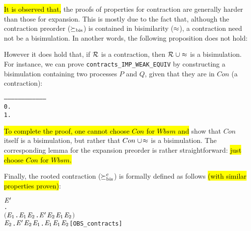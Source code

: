 \hl{It is observed that,} the proofs of properties for contraction are
generally harder than those for expansion. This is mostly due to the fact
  that, although the contraction preorder ($\mathrel{\succeq_{\rm{bis}}}$) is contained in
  bisimilarity ($\approx$), a contraction need not be a bisimulation.
  In another words, the following proposition does not hold:
\begin{alltt}
\end{alltt}
However it does hold that, if ${\cal R}$ is a contraction, then
 ${\cal R}\;\cup \approx$ is a bisimulation.
For instance, we can prove \texttt{contracts_IMP_WEAK_EQUIV}
 by constructing a bisimulation  containing two processes
$P$ and $Q$, given that they are in $Con$ (a contraction):
\begin{alltt}
   ------------------------------------
    0.  
    1.  
\end{alltt}
\hl{To complete the proof, one cannot choose $Con$ for $Wbsm$ and}
show that $Con$ itself is a bisimulation, but rather
that $Con\;\cup\!\approx$ is a bisimulation.
The corresponding lemma for the expansion preorder is rather
straightforward: \hl{just choose $Con$ for $Wbsm$.}

Finally, the rooted contraction ($\mathrel{\succeq^{\rm{c}}_{\rm{bis}}}$) is formally
defined as follows \hl{(with similar properties proven)}:
\begin{alltt}
    \HOLSymConst{\HOLTokenObsContracts} \ensuremath{\HOLFreeVar{E}\sp{\prime}} \HOLTokenDefEquality{}
     \HOLSymConst{\HOLTokenForall{}}.
         \ensuremath{(}\HOLSymConst{\HOLTokenForall{}}\ensuremath{\HOLBoundVar{E}\sb{\mathrm{1}}}.  \HOLTokenTransBegin{}\HOLTokenTransEnd \ensuremath{\HOLBoundVar{E}\sb{\mathrm{1}}} \HOLSymConst{\HOLTokenImp{}} \HOLSymConst{\HOLTokenExists{}}\ensuremath{\HOLBoundVar{E}\sb{\mathrm{2}}}. \ensuremath{\HOLFreeVar{E}\sp{\prime}} \HOLTokenTransBegin{}\HOLTokenTransEnd \ensuremath{\HOLBoundVar{E}\sb{\mathrm{2}}} \HOLSymConst{\HOLTokenConj{}} \ensuremath{\HOLBoundVar{E}\sb{\mathrm{1}}} \HOLSymConst{\HOLTokenContracts{}} \ensuremath{\HOLBoundVar{E}\sb{\mathrm{2}}}\ensuremath{)} \HOLSymConst{\HOLTokenConj{}}
         \HOLSymConst{\HOLTokenForall{}}\ensuremath{\HOLBoundVar{E}\sb{\mathrm{2}}}. \ensuremath{\HOLFreeVar{E}\sp{\prime}} \HOLTokenTransBegin{}\HOLTokenTransEnd \ensuremath{\HOLBoundVar{E}\sb{\mathrm{2}}} \HOLSymConst{\HOLTokenImp{}} \HOLSymConst{\HOLTokenExists{}}\ensuremath{\HOLBoundVar{E}\sb{\mathrm{1}}}.  \HOLTokenWeakTransBegin{}\HOLTokenWeakTransEnd \ensuremath{\HOLBoundVar{E}\sb{\mathrm{1}}} \HOLSymConst{\HOLTokenConj{}} \ensuremath{\HOLBoundVar{E}\sb{\mathrm{1}}} \HOLSymConst{\HOLTokenWeakEQ} \ensuremath{\HOLBoundVar{E}\sb{\mathrm{2}}}\hfill{[OBS_contracts]}
\end{alltt}

